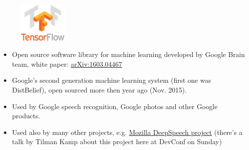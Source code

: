 \documentclass[10pt,utf8]{beamer}
\begin{document}
\begin{frame}
	\begin{figure}
		\centering
		\includegraphics[height=2cm]{./img/tensorflow_logo.eps}
	\end{figure}
	\begin{itemize}	
		\item Open source software library for machine learning developed by Google Brain team, white paper: \color{blue}\href{https://arxiv.org/abs/1603.04467}{arXiv:1603.04467}\color{black}
		\pause
		\item Google's second generation machine learning system (first one was DistBelief), open sourced more then year ago (Nov. 2015).
		\pause
		\item Used by Google speech recognition, Google photos and other Google products. 
		\pause
		\item Used also by many other projects, e.g. \color{blue} \href{https://github.com/mozilla/DeepSpeech}{Mozilla DeepSpeech project} \color{black}
		(there's a talk by Tilman Kamp about this project here at DevConf on Sunday)
	\end{itemize}
\end{frame}
\end{document}
